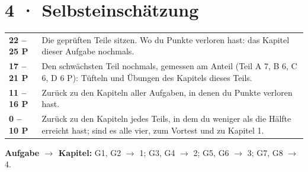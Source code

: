 \documentclass[11pt]{article}
\begin{document}
\section*{4 · Selbsteinschätzung}
\begin{tabularx}{\linewidth}{@{}l X@{}}
\toprule
\textbf{22 – 25 P} & Die geprüften Teile sitzen. Wo du Punkte verloren hast: das Kapitel dieser Aufgabe nochmals.\\
\textbf{17 – 21 P} & Den schwächsten Teil nochmals, gemessen am Anteil (Teil A 7, B 6, C 6, D 6 P): Tüfteln und Übungen des Kapitels dieses Teils.\\
\textbf{11 – 16 P} & Zurück zu den Kapiteln aller Aufgaben, in denen du Punkte verloren hast.\\
\textbf{0 – 10 P} & Zurück zu den Kapiteln jedes Teils, in dem du weniger als die Hälfte erreicht hast; sind es alle vier, zum Vortest und zu Kapitel 1.\\
\bottomrule
\end{tabularx}

\smallskip
\textbf{Aufgabe $\to$ Kapitel:} G1, G2 $\to$ 1; G3, G4 $\to$ 2; G5, G6 $\to$ 3; G7, G8 $\to$ 4.
\end{document}
